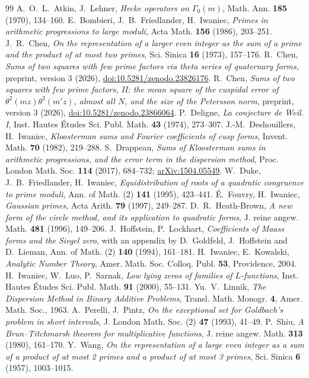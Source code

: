 \documentclass[11pt]{amsart}
\theoremstyle{remark}
\begin{document}
\begin{thebibliography}{99}
 A.~O.~L.~Atkin, J.~Lehner, \emph{Hecke operators on $\Gamma_0(m)$}, Math. Ann. \textbf{185} (1970), 134--160.
 E.~Bombieri, J.~B.~Friedlander, H.~Iwaniec, \emph{Primes in arithmetic progressions to large moduli}, Acta Math. \textbf{156} (1986), 203--251.
 J.~R.~Chen, \emph{On the representation of a larger even integer as the sum of a prime and the product of at most two primes}, Sci. Sinica \textbf{16} (1973), 157--176.
 R.~Chen, \emph{Sums of two squares with few prime factors via theta series of quaternary forms}, preprint, version 3 (2026), \href{https://doi.org/10.5281/zenodo.23826176}{doi:10.5281/zenodo.23826176}.
 R.~Chen, \emph{Sums of two squares with few prime factors, II: the mean square of the cuspidal error of $\theta^2(mz)\theta^2(m'z)$, almost all $N$, and the size of the Petersson norm}, preprint, version 3 (2026), \href{https://doi.org/10.5281/zenodo.23866064}{doi:10.5281/zenodo.23866064}.
 P.~Deligne, \emph{La conjecture de Weil. I}, Inst. Hautes \'Etudes Sci. Publ. Math. \textbf{43} (1974), 273--307.
 J.-M.~Deshouillers, H.~Iwaniec, \emph{Kloosterman sums and Fourier coefficients of cusp forms}, Invent. Math. \textbf{70} (1982), 219--288.
 S.~Drappeau, \emph{Sums of Kloosterman sums in arithmetic progressions, and the error term in the dispersion method}, Proc. London Math. Soc. \textbf{114} (2017), 684--732; \href{https://arxiv.org/abs/1504.05549}{arXiv:1504.05549}.
 W.~Duke, J.~B.~Friedlander, H.~Iwaniec, \emph{Equidistribution of roots of a quadratic congruence to prime moduli}, Ann. of Math. (2) \textbf{141} (1995), 423--441.
 \'E.~Fouvry, H.~Iwaniec, \emph{Gaussian primes}, Acta Arith. \textbf{79} (1997), 249--287.
 D.~R.~Heath-Brown, \emph{A new form of the circle method, and its application to quadratic forms}, J. reine angew. Math. \textbf{481} (1996), 149--206.
 J.~Hoffstein, P.~Lockhart, \emph{Coefficients of Maass forms and the Siegel zero}, with an appendix by D.~Goldfeld, J.~Hoffstein and D.~Lieman, Ann. of Math. (2) \textbf{140} (1994), 161--181.
 H.~Iwaniec, E.~Kowalski, \emph{Analytic Number Theory}, Amer. Math. Soc. Colloq. Publ. \textbf{53}, Providence, 2004.
 H.~Iwaniec, W.~Luo, P.~Sarnak, \emph{Low lying zeros of families of $L$-functions}, Inst. Hautes \'Etudes Sci. Publ. Math. \textbf{91} (2000), 55--131.
 Yu.~V.~Linnik, \emph{The Dispersion Method in Binary Additive Problems}, Transl. Math. Monogr. \textbf{4}, Amer. Math. Soc., 1963.
 A.~Perelli, J.~Pintz, \emph{On the exceptional set for Goldbach's problem in short intervals}, J. London Math. Soc. (2) \textbf{47} (1993), 41--49.
 P.~Shiu, \emph{A Brun--Titchmarsh theorem for multiplicative functions}, J. reine angew. Math. \textbf{313} (1980), 161--170.
 Y.~Wang, \emph{On the representation of a large even integer as a sum of a product of at most 2 primes and a product of at most 3 primes}, Sci. Sinica \textbf{6} (1957), 1003--1015.
\end{thebibliography}
\end{document}
